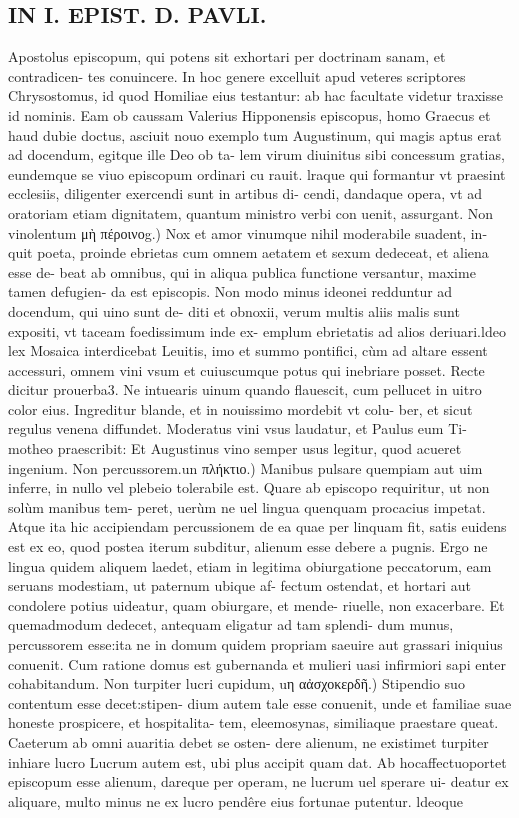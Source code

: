 \documentclass{article}
\begin{document}
\begin{pages}
\section*{IN I. EPIST. D. PAVLI. }
\marginpar{[ p.78 ]}\pstart Apostolus episcopum, qui potens sit exhortari per doctrinam sanam, et contradicen- tes conuincere. In hoc genere excelluit apud veteres scriptores Chrysostomus, id quod Homiliae eius testantur: ab hac facultate videtur traxisse id nominis. Eam ob caussam Valerius Hipponensis episcopus, homo Graecus et haud dubie doctus, asciuit nouo exemplo tum Augustinum, qui magis aptus erat ad docendum, egitque ille Deo ob ta- lem virum diuinitus sibi concessum gratias, eundemque se viuo episcopum ordinari cu rauit. lraque qui formantur vt praesint ecclesiis, diligenter exercendi sunt in artibus di- cendi, dandaque opera, vt ad oratoriam etiam dignitatem, quantum ministro verbi con uenit, assurgant.  \pend\pstart Non vinolentum μὴ πέροινοg.) Nox et amor vinumque nihil moderabile suadent, in- quit poeta, proinde ebrietas cum omnem aetatem et sexum dedeceat, et aliena esse de- beat ab omnibus, qui in aliqua publica functione versantur, maxime tamen defugien- da est episcopis. Non modo minus ideonei redduntur ad docendum, qui uino sunt de- diti et obnoxii, verum multis aliis malis sunt expositi, vt taceam foedissimum inde ex- emplum ebrietatis ad alios deriuari.ldeo lex Mosaica interdicebat Leuitis, imo et summo pontifici, cùm ad altare essent accessuri, omnem vini vsum et cuiuscumque potus qui inebriare posset. Recte dicitur prouerba3. Ne intuearis uinum quando flauescit, cum pellucet in uitro color eius. Ingreditur blande, et in nouissimo mordebit vt colu- ber, et sicut regulus venena diffundet. Moderatus vini vsus laudatur, et Paulus eum Ti- motheo praescribit: Et Augustinus vino semper usus legitur, quod acueret ingenium.  \pend\pstart Non percussorem.un πλήκτιο.) Manibus pulsare quempiam aut uim inferre, in nullo vel plebeio tolerabile est. Quare ab episcopo requiritur, ut non solùm manibus tem- peret, uerùm ne uel lingua quenquam procacius impetat. Atque ita hic accipiendam percussionem de ea quae per linquam fit, satis euidens est ex eo, quod postea iterum subditur, alienum esse debere a pugnis. Ergo ne lingua quidem aliquem laedet, etiam in legitima obiurgatione peccatorum, eam seruans modestiam, ut paternum ubique af- fectum ostendat, et hortari aut condolere potius uideatur, quam obiurgare, et mende- riuelle, non exacerbare. Et quemadmodum dedecet, antequam eligatur ad tam splendi- dum munus, percussorem esse:ita ne in domum quidem propriam saeuire aut grassari iniquius conuenit. Cum ratione domus est gubernanda et mulieri uasi infirmiori sapi enter cohabitandum.  \pend\pstart Non turpiter lucri cupidum, uη αἀσχοκερδῆ.) Stipendio suo contentum esse decet:stipen- dium autem tale esse conuenit, unde et familiae suae honeste prospicere, et hospitalita- tem, eleemosynas, similiaque praestare queat. Caeterum ab omni auaritia debet se osten- dere alienum, ne existimet turpiter inhiare lucro Lucrum autem est, ubi plus accipit quam dat. Ab hocaffectuoportet episcopum esse alienum, dareque per operam, ne lucrum uel sperare ui- deatur ex aliquare, multo minus ne ex lucro pendêre eius fortunae putentur. ldeoque  
\end{pages}
\end{document}
